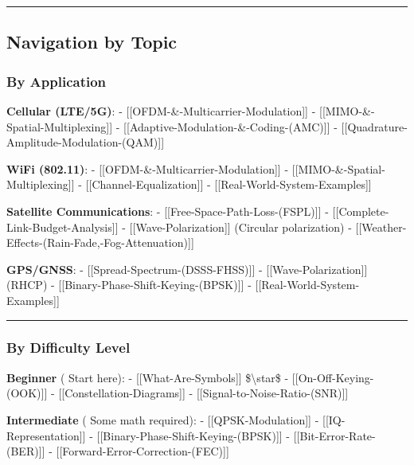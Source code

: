 \begin{center}\rule{0.5\linewidth}{0.5pt}\end{center}

\subsection{\texorpdfstring{ Navigation by
Topic}{ Navigation by Topic}}\label{navigation-by-topic}

\subsubsection{By Application}\label{by-application}

\textbf{Cellular (LTE/5G)}: -
{[}{[}OFDM-\&-Multicarrier-Modulation{]}{]} -
{[}{[}MIMO-\&-Spatial-Multiplexing{]}{]} -
{[}{[}Adaptive-Modulation-\&-Coding-(AMC){]}{]} -
{[}{[}Quadrature-Amplitude-Modulation-(QAM){]}{]}

\textbf{WiFi (802.11)}: - {[}{[}OFDM-\&-Multicarrier-Modulation{]}{]} -
{[}{[}MIMO-\&-Spatial-Multiplexing{]}{]} -
{[}{[}Channel-Equalization{]}{]} -
{[}{[}Real-World-System-Examples{]}{]}

\textbf{Satellite Communications}: -
{[}{[}Free-Space-Path-Loss-(FSPL){]}{]} -
{[}{[}Complete-Link-Budget-Analysis{]}{]} -
{[}{[}Wave-Polarization{]}{]} (Circular polarization) -
{[}{[}Weather-Effects-(Rain-Fade,-Fog-Attenuation){]}{]}

\textbf{GPS/GNSS}: - {[}{[}Spread-Spectrum-(DSSS-FHSS){]}{]} -
{[}{[}Wave-Polarization{]}{]} (RHCP) -
{[}{[}Binary-Phase-Shift-Keying-(BPSK){]}{]} -
{[}{[}Real-World-System-Examples{]}{]}

\begin{center}\rule{0.5\linewidth}{0.5pt}\end{center}

\subsubsection{By Difficulty Level}\label{by-difficulty-level}

\textbf{Beginner} ( Start here): - {[}{[}What-Are-Symbols{]}{]}
\$\textbackslash star\$ - {[}{[}On-Off-Keying-(OOK){]}{]} -
{[}{[}Constellation-Diagrams{]}{]} -
{[}{[}Signal-to-Noise-Ratio-(SNR){]}{]}

\textbf{Intermediate} ( Some math required): -
{[}{[}QPSK-Modulation{]}{]} - {[}{[}IQ-Representation{]}{]} -
{[}{[}Binary-Phase-Shift-Keying-(BPSK){]}{]} -
{[}{[}Bit-Error-Rate-(BER){]}{]} -
{[}{[}Forward-Error-Correction-(FEC){]}{]}

